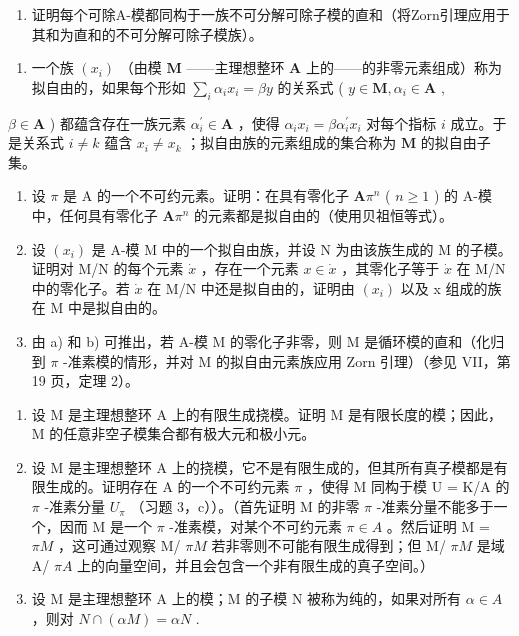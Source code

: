 \begin{enumerate}
\def\labelenumi{\alph{enumi})}
\setcounter{enumi}{4}
\tightlist
\item
  证明每个可除A-模都同构于一族不可分解可除子模的直和（将Zorn引理应用于其和为直和的不可分解可除子模族）。
\end{enumerate}

\begin{enumerate}
\def\labelenumi{\arabic{enumi})}
\setcounter{enumi}{3}
\tightlist
\item
  一个族 \((x_{i})\) （由模 \(\mathbf{M}\) ——主理想整环 \(\mathbf{A}\) 上的——的非零元素组成）称为拟自由的，如果每个形如 \(\sum_{i} \alpha_{i} x_{i} = \beta y\) 的关系式 ( \(y \in \mathbf{M}, \alpha_{i} \in \mathbf{A}\) ,
\end{enumerate}

\(\beta \in \mathbf{A}\) ) 都蕴含存在一族元素 \(\alpha_{i}^{\prime} \in \mathbf{A}\) ，使得 \(\alpha_{i}x_{i} = \beta \alpha_{i}^{\prime} x_{i}\) 对每个指标 \(i\) 成立。于是关系式 \(i \neq k\) 蕴含 \(x_{i} \neq x_{k}\) ；拟自由族的元素组成的集合称为 \(\mathbf{M}\) 的拟自由子集。

\begin{enumerate}
\def\labelenumi{\alph{enumi})}
\item
  设 \(\pi\) 是 A 的一个不可约元素。证明：在具有零化子 \(\mathbf{A}\pi^n\) ( \(n \geqslant 1\) ) 的 A-模中，任何具有零化子 \(\mathbf{A}\pi^n\) 的元素都是拟自由的（使用贝祖恒等式）。
\item
  设 \((x_{i})\) 是 A-模 M 中的一个拟自由族，并设 N 为由该族生成的 M 的子模。证明对 M/N 的每个元素 \(\dot{x}\) ，存在一个元素 \(x \in \dot{x}\) ，其零化子等于 \(\dot{x}\) 在 M/N 中的零化子。若 \(\dot{x}\) 在 M/N 中还是拟自由的，证明由 \((x_{i})\) 以及 x 组成的族在 M 中是拟自由的。
\item
  由 a) 和 b) 可推出，若 A-模 M 的零化子非零，则 M 是循环模的直和（化归到 \(\pi\) -准素模的情形，并对 M 的拟自由元素族应用 Zorn 引理）（参见 VII，第 19 页，定理 2）。
\end{enumerate}

\begin{enumerate}
\def\labelenumi{\arabic{enumi})}
\setcounter{enumi}{4}
\item
  设 M 是主理想整环 A 上的有限生成挠模。证明 M 是有限长度的模；因此，M 的任意非空子模集合都有极大元和极小元。
\item
  设 M 是主理想整环 A 上的挠模，它不是有限生成的，但其所有真子模都是有限生成的。证明存在 A 的一个不可约元素 \(\pi\) ，使得 M 同构于模 U = K/A 的 \(\pi\) -准素分量 \(U_{\pi}\) （习题 3，c））。（首先证明 M 的非零 \(\pi\) -准素分量不能多于一个，因而 M 是一个 \(\pi\) -准素模，对某个不可约元素 \(\pi \in A\) 。然后证明 M = \(\pi M\) ，这可通过观察 M/ \(\pi M\) 若非零则不可能有限生成得到；但 M/ \(\pi M\) 是域 A/ \(\pi A\) 上的向量空间，并且会包含一个非有限生成的真子空间。）
\item
  设 M 是主理想整环 A 上的模；M 的子模 N 被称为纯的，如果对所有 \(\alpha \in A\) ，则对 \(N \cap (\alpha M) = \alpha N\) .
\end{enumerate}

